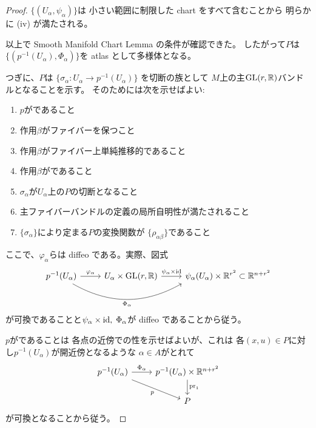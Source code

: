 \documentclass[report]{jlreq}
\begin{document}
\begin{proof}
    $\{ (U_\alpha, \psi_\alpha) \}$は
    小さい範囲に制限した chart をすべて含むことから
    明らかに (iv) が満たされる。

    以上で Smooth Manifold Chart Lemma の条件が確認できた。
    したがって$P$は
    $\{ (p^{-1}(U_\alpha), \Phi_\alpha) \}$を atlas として多様体となる。

    つぎに、$P$は
    $\{ \sigma_\alpha \colon U_\alpha \to p^{-1}(U_\alpha) \}$
    を切断の族として
    $M$上の主$\operatorname{\mathrm{GL}}(r, \mathbb{R})$バンドルとなることを示す。
    そのためには次を示せばよい:
    \begin{enumerate}
        \item $p$が{\smooth}であること
        \item 作用$\beta$がファイバーを保つこと
        \item 作用$\beta$がファイバー上単純推移的であること
        \item 作用$\beta$が{\smooth}であること
        \item $\sigma_\alpha$が$U_\alpha$上の$P$の切断となること
        \item 主ファイバーバンドルの定義の局所自明性が満たされること
        \item $\{ \sigma_\alpha \}$により定まる$P$の変換関数が
            $\{ \rho_{\alpha\beta} \}$であること
    \end{enumerate}
    ここで、$\varphi_\alpha$らは diffeo である。実際、図式
    \begin{equation}
        \begin{tikzcd}
            p^{-1}(U_\alpha)
                \ar{r}{\varphi_\alpha}
                \ar[bend right=30, end anchor=south west]{rr}[swap]{\Phi_\alpha}
                & U_\alpha \times \GL(r, \R)
                \ar{r}{\psi_\alpha \times \id}
                & \psi_\alpha(U_\alpha) \times \R^{r^2}
                \subset \R^{n + r^2}
        \end{tikzcd}
    \end{equation}
    が可換であることと$\psi_\alpha \times \mathrm{id}, \; \Phi_\alpha$が
    diffeo であることから従う。

    $p$が{\smooth}であることは
    各点の近傍での{\smooth}性を示せばよいが、これは
    各$(x, u) \in P$に対し$p^{-1}(U_\alpha)$が開近傍となるような
    $\alpha \in A$がとれて
    \begin{equation}
        \begin{tikzcd}
            p^{-1}(U_\alpha)
                \ar{rd}[swap]{p}
                \ar{r}{\Phi_\alpha}
                & p^{-1}(U_\alpha) \times \R^{n + r^2}
                \ar{d}{\mathrm{pr}_1} \\
            & P
        \end{tikzcd}
    \end{equation}
    が可換となることから従う。


\end{proof}
\end{document}
